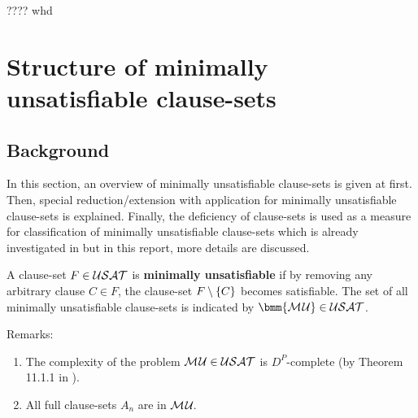 \documentclass{report}
\begin{document}
\begin{quest}\label{que:game}
????  whd
\end{quest}

\chapter{Structure of minimally unsatisfiable clause-sets}
\label{cha:mucls}

\section{Background}
\label{sec:basicdef}

In this section, an overview of minimally unsatisfiable clause-sets is given at first. Then, special reduction/extension with application for minimally unsatisfiable clause-sets is explained. Finally, the deficiency of clause-sets is used as a measure for classification of minimally unsatisfiable clause-sets which is already investigated in \cite{KullmannZhao2010Extremal, Kullmann2007HandbuchMU, KullmannZhao2016UHitSAT, KleineBuening2000SubclassesMU, Ku99dK} but in this report, more details are discussed.

\begin{defi}\label{def:mu}
A clause-set $F \in \mathcal{USAT}$ is \textbf{minimally unsatisfiable} if by removing any arbitrary clause $C \in F$, the clause-set $F \setminus \{ C \}$ becomes satisfiable. The set of all minimally unsatisfiable clause-sets is indicated by $\bmm{\Musat} \in \Usat$.
\end{defi}
Remarks:
  \begin{enumerate}
  \item The complexity of the problem $\mathcal{M\hspace{0.8pt}U} \in \mathcal{USAT}$ is $D^P$-complete (by Theorem 11.1.1 in \cite{Kullmann2007HandbuchMU}).
  \item All full clause-sets $ A_n$ are in $\mathcal{M\hspace{0.8pt}U}_{\!}$.
  \end{enumerate}
\end{document}
